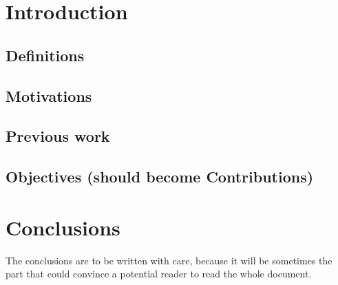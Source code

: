 \documentclass[11pt,a4paper,oneside]{book}
\theoremstyle{plain}
\theoremstyle{definition}
\begin{document}
\thispagestyle{empty} 
\setcounter{page}{0}
\tableofcontents


\mainmatter
\setcounter{page}{1}

\chapter{Introduction}

\section{Definitions}

\section{Motivations}


\section{Previous work}

\section{Objectives (should become Contributions)}


\vspace*{0.5cm}
\chapter*{Conclusions}

The conclusions are to be written with care, because it will be sometimes the part that could convince a potential reader to read the whole document.

\appendix

\backmatter

\printindex %



\end{document}
